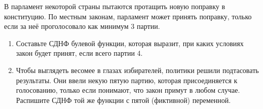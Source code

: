 \question
В парламент некоторой страны пытаются протащить новую поправку в конституцию. По местным законам, парламент может принять поправку, только если за неё проголосовало как минимум 3 партии.

\begin{enumerate}
    \item Составьте СДНФ булевой функции, которая выразит, при каких условиях закон будет принят, если всего партии 4.
    \item Чтобы выглядеть весомее в глазах избирателей, политики решили подтасовать результаты.  Они ввели некую пятую партию, которая присоединяется к голосованию, только если понимают, что закон примут в любом случае. Распишите СДНФ той же функции с пятой (фиктивной) переменной.
\end{enumerate}